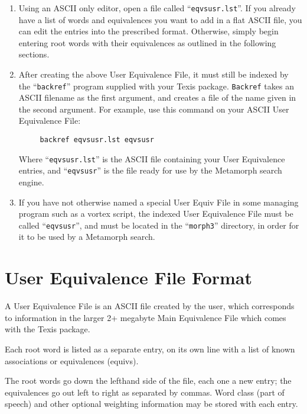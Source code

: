 \begin{enumerate}

\item Using an ASCII only editor, open a file called
``\verb`eqvsusr.lst`''.  If you already have a list of words and
equivalences you want to add in a flat ASCII file, you can edit the
entries into the prescribed format.  Otherwise, simply begin entering
root words with their equivalences as outlined in the following
sections.

\item After creating the above User Equivalence File, it must still be
indexed by the ``\verb`backref`'' program supplied with your Texis
package.  \verb`Backref` takes an ASCII filename as the first
argument, and creates a file of the name given in the second argument.
For example, use this command on your ASCII User Equivalence File:

\begin{verbatim}
     backref eqvsusr.lst eqvsusr
\end{verbatim}
   Where ``\verb`eqvsusr.lst`'' is the ASCII file containing your User Equivalence
   entries, and ``\verb`eqvsusr`'' is the file ready for use by the
   Metamorph search engine.

\item If you have not otherwise named a special User Equiv File in
some managing program such as a vortex script, the indexed User
Equivalence File must be called ``\verb`eqvsusr`'', and must be
located in the ``\verb`morph3`'' directory, in order for it to be used
by a Metamorph search.
\end{enumerate}

\section{User Equivalence File Format}

A User Equivalence File is an ASCII file created by the user, which
corresponds to information in the larger 2+ megabyte Main Equivalence
File which comes with the Texis package.

Each root word is listed as a separate entry, on its own line with a
list of known associations or equivalences (equivs).

The root words go down the lefthand side of the file, each one a new
entry; the equivalences go out left to right as separated by commas.
Word class (part of speech) and other optional weighting information
may be stored with each entry.

